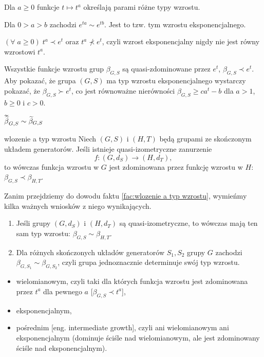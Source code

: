 \begin{example}[m]
  \item Dla $a\geq0$ funkcje $t\mapsto t^a$ określają parami różne typy wzrostu.
  \item Dla $0>a>b$ zachodzi $e^{ta}\sim e^{tb}$. Jest to tzw. tym wzrostu eksponencjalnego.
  \item $(\forall\;a\geq0)\;t^a\prec e^t$ oraz $t^a\not\prec e^t$, czyli wzrost eksponencjalny nigdy nie jest równy wzrostowi $t^a$.
  \item Wszystkie funkcje wzrostu grup $\beta_{G,S}$ są quasi-zdominowane przez $e^t$, $\beta_{G,S}\prec e^t$. Aby pokazać, że grupa $(G,S)$ ma typ wzrostu eksponencjalnego wystarczy pokazać, że $\beta_{G,S}\succ e^t$, co jest równoważne nierówności $\beta_{G,S}\geq ca^t-b$ dla $a>1$, $b\geq0$ i $c>0$.
  \item $\doublewidetilde{\beta}_{G,S}\sim\widetilde{\beta}_{G,S}$
\end{example}

\begin{fact}{}{wlozenie a typ wzrostu}
  Niech $(G,S)$ i $(H,T)$ będą grupami ze skończonym układem generatorów. Jeśli istnieje quasi-izometryczne zanurzenie 
  $$f:(G, d_S)\to (H, d_T),$$
  to wówczas funkcja wzrostu w $G$ jest zdominowana przez funkcję wzrostu w $H$: $\beta_{G,S}\prec \beta_{H,T}$.
\end{fact}

Zanim przejdziemy do dowodu faktu \ref{fac:wlozenie a typ wzrostu}, wymieńmy kilka ważnych wniosków z niego wynikających.

\begin{conclusion}{}{}
  \begin{enumerate}
    \item Jeśli grupy $(G, d_S)$ i $(H, d_T)$ są quasi-izometryczne, to wówczas mają ten sam typ wzrostu: $\beta_{G,S}\sim\beta_{H,T}$.
    \item Dla różnych skończonych układów generatorów $S_1, S_2$ grupy $G$ zachodzi $\beta_{G, S_1}\sim \beta_{G,S_2}$, czyli grupa jednoznacznie determinuje swój typ wzrostu.
  \end{enumerate}
\end{conclusion}

\begin{itemize}
  \item wielomianowym, czyli taki dla których funkcja wzrostu jest zdominowana przez $t^a$ dla pewnego $a$ [$\beta_{G,S}\prec t^a$],
  \item eksponencjalnym,
  \item pośrednim [eng. intermediate growth], czyli ani wielomianowym ani eksponencjalnym (dominuje ściśle nad wielomianowym, ale jest zdominowany ściśle nad eksponencjalnym).
\end{itemize}

